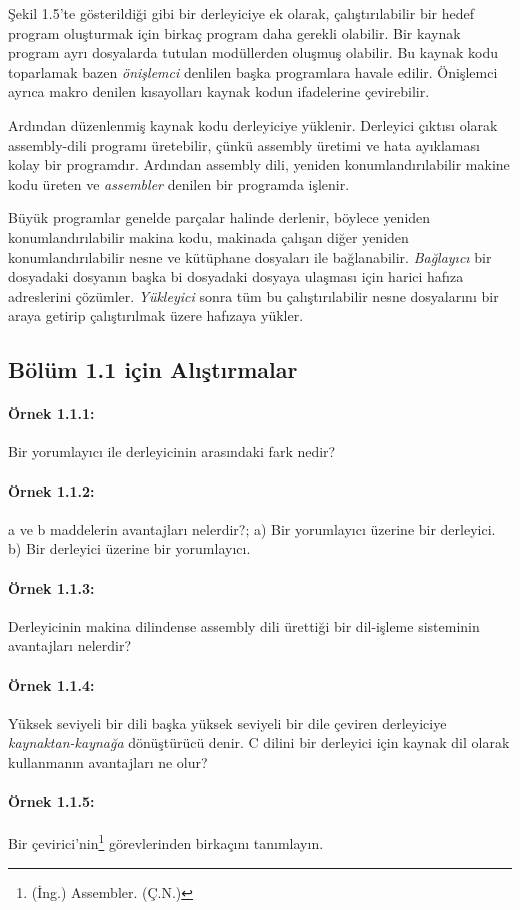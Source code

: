 Şekil 1.5'te gösterildiği gibi bir derleyiciye ek olarak, çalıştırılabilir bir hedef program oluşturmak için birkaç program daha gerekli olabilir. Bir kaynak program ayrı dosyalarda tutulan modüllerden oluşmuş olabilir. Bu kaynak kodu toparlamak bazen \textit{önişlemci} denlilen başka programlara havale edilir. Önişlemci ayrıca makro denilen kısayolları kaynak kodun ifadelerine çevirebilir.

Ardından düzenlenmiş kaynak kodu derleyiciye yüklenir. Derleyici çıktısı olarak assembly-dili programı üretebilir, çünkü assembly üretimi ve hata ayıklaması kolay bir programdır. Ardından assembly dili, yeniden konumlandırılabilir makine kodu üreten ve \textit{assembler} denilen bir programda işlenir.

Büyük programlar genelde parçalar halinde derlenir, böylece yeniden konumlandırılabilir makina kodu, makinada çalışan diğer yeniden konumlandırılabilir nesne ve kütüphane dosyaları ile bağlanabilir. \textit{Bağlayıcı} bir dosyadaki dosyanın başka bi dosyadaki dosyaya ulaşması için harici hafıza adreslerini çözümler. \textit{Yükleyici} sonra tüm bu çalıştırılabilir nesne dosyalarını bir araya getirip çalıştırılmak üzere hafızaya yükler.  

\subsection{Bölüm 1.1 için Alıştırmalar}

\paragraph{Örnek 1.1.1:} Bir yorumlayıcı ile derleyicinin arasındaki fark nedir?

\paragraph{Örnek 1.1.2:}  a ve b maddelerin avantajları nelerdir?; a) Bir yorumlayıcı üzerine bir derleyici. b) Bir derleyici üzerine bir yorumlayıcı.

\paragraph{Örnek 1.1.3:} Derleyicinin makina dilindense assembly dili ürettiği bir dil-işleme sisteminin avantajları nelerdir?

\paragraph{Örnek 1.1.4:} Yüksek seviyeli bir dili başka yüksek seviyeli bir dile çeviren derleyiciye \textit{kaynaktan-kaynağa} dönüştürücü denir. C dilini bir derleyici için kaynak dil olarak kullanmanın avantajları ne olur?

\setcounter{footnote}{0}
\paragraph{Örnek 1.1.5:}  Bir çevirici'nin\footnote{(İng.) Assembler. (Ç.N.)} görevlerinden birkaçını tanımlayın.

